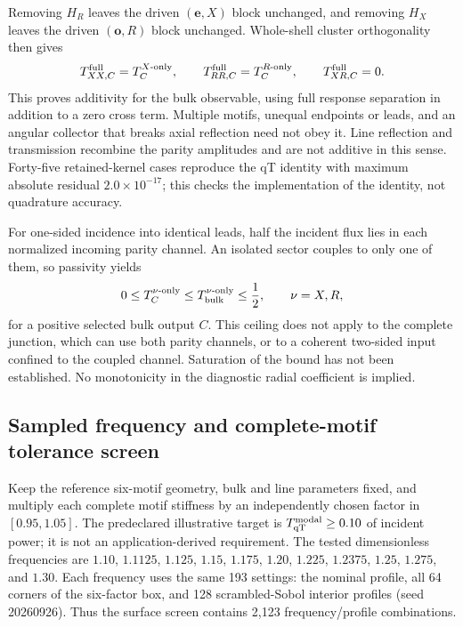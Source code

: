 \documentclass[10pt,aps,onecolumn,notitlepage,nofootinbib]{revtex4-2}
\newcommand{\qT}{\mathrm{qT}}
\begin{document}
Removing $H_R$ leaves the driven $(\bm e,X)$ block unchanged, and removing $H_X$ leaves the driven $(\bm o,R)$ block unchanged. Whole-shell cluster orthogonality then gives
\begin{equation}
 T_{XX,C}^{\rm full}=T_C^{X\text{-only}},\qquad
 T_{RR,C}^{\rm full}=T_C^{R\text{-only}},\qquad
 T_{XR,C}^{\rm full}=0.
 \label{eq:sm-pred-one-motif-identity}
\end{equation}
This proves additivity for the bulk observable, using full response separation in addition to a zero cross term. Multiple motifs, unequal endpoints or leads, and an angular collector that breaks axial reflection need not obey it. Line reflection and transmission recombine the parity amplitudes and are not additive in this sense. Forty-five retained-kernel cases reproduce the qT identity with maximum absolute residual $2.0\times10^{-17}$; this checks the implementation of the identity, not quadrature accuracy.

For one-sided incidence into identical leads, half the incident flux lies in each normalized incoming parity channel. An isolated sector couples to only one of them, so passivity yields
\begin{equation}
 0\leq T_C^{\nu\text{-only}}
 \leq T_{\rm bulk}^{\nu\text{-only}}\leq\frac12,
 \qquad \nu=X,R,
 \label{eq:sm-pred-one-motif-half}
\end{equation}
for a positive selected bulk output $C$. This ceiling does not apply to the complete junction, which can use both parity channels, or to a coherent two-sided input confined to the coupled channel. Saturation of the bound has not been established. No monotonicity in the diagnostic radial coefficient is implied.

\subsection{Sampled frequency and complete-motif tolerance screen}
\label{sec:sm-pred-sampled-band}

Keep the reference six-motif geometry, bulk and line parameters fixed, and multiply each complete motif stiffness by an independently chosen factor in $[0.95,1.05]$. The predeclared illustrative target is $T_{\qT}^{\rm modal}\geq0.10$ of incident power; it is not an application-derived requirement. The tested dimensionless frequencies are $1.10$, $1.1125$, $1.125$, $1.15$, $1.175$, $1.20$, $1.225$, $1.2375$, $1.25$, $1.275$, and $1.30$. Each frequency uses the same 193 settings: the nominal profile, all 64 corners of the six-factor box, and 128 scrambled-Sobol interior profiles (seed 20260926). Thus the surface screen contains 2,123 frequency/profile combinations.
\end{document}
